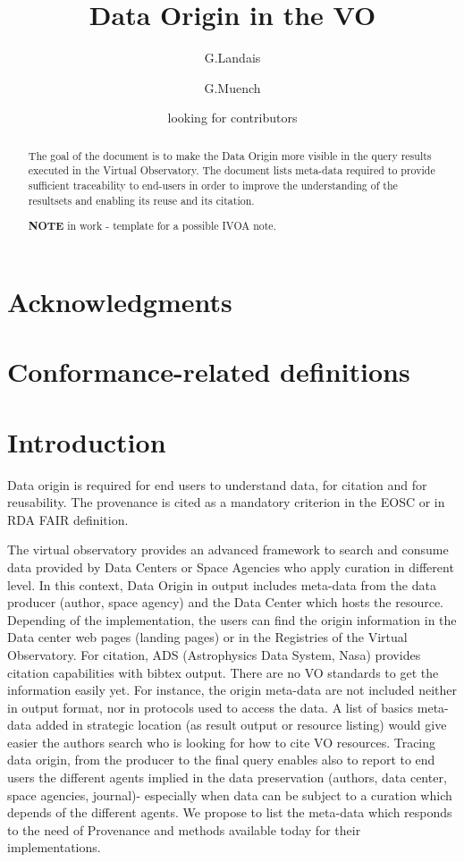 \documentclass[11pt,a4paper]{ivoa}
\title{Data Origin in the VO}
\author{G.Landais}
\author{G.Muench}
\author{looking for contributors}
\begin{document}
\begin{abstract}
The goal of the document is to make the Data Origin more visible in the query results executed in the Virtual Observatory. 
The document lists meta-data required to provide sufficient traceability to end-users in order to improve the understanding 
of the resultsets and enabling its reuse and its citation.


\textbf{NOTE} in work -  template for a possible IVOA note.
\end{abstract}


\section*{Acknowledgments}


\section*{Conformance-related definitions}


\section{Introduction}

Data origin is required for end users to understand data, for citation and for reusability. The  provenance is cited as a mandatory criterion in the EOSC or in RDA FAIR definition. 

The virtual observatory provides an advanced framework to search and consume data provided by Data Centers or Space Agencies who apply curation in different level.  In this context, Data Origin in output includes meta-data from the data producer (author, space agency) and the Data Center which hosts the resource. 
Depending of the implementation, the users can find the origin information in the Data center web pages (landing pages) or in the Registries of the Virtual Observatory. For citation, ADS (Astrophysics Data System, Nasa) provides citation capabilities with bibtex output. There are no VO standards to get the information easily yet. For instance, the origin meta-data are not included neither in output format, nor in protocols used to access the data.
A list of basics meta-data added in strategic location (as result output or resource listing) would give easier the authors search who is looking for how to cite VO resources. Tracing data origin, from the producer to the final query enables also to report to end users the different agents implied in the data preservation (authors, data center, space agencies, journal)- especially when data can be subject to a curation  which depends of the different agents.
We propose to list the meta-data which responds to the need of Provenance and methods available today for their implementations. 
\end{document}
